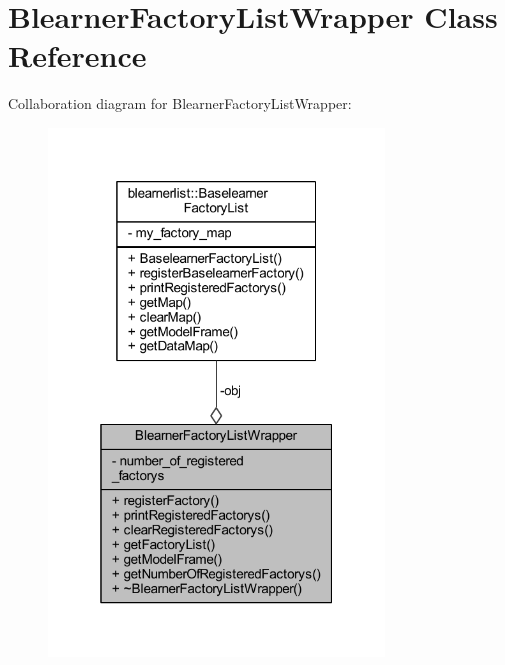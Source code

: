 \hypertarget{class_blearner_factory_list_wrapper}{}\section{Blearner\+Factory\+List\+Wrapper Class Reference}
\label{class_blearner_factory_list_wrapper}


Collaboration diagram for Blearner\+Factory\+List\+Wrapper\+:\nopagebreak
\begin{figure}[H]
\begin{center}
\leavevmode
\includegraphics[width=253pt]{class_blearner_factory_list_wrapper__coll__graph}
\end{center}
\end{figure}
